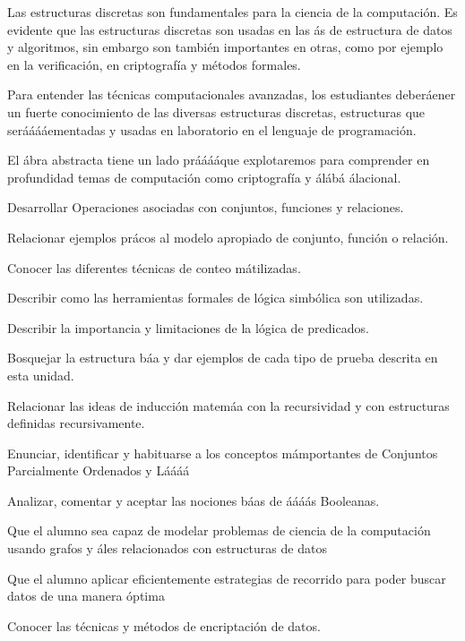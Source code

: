 \begin{syllabus}


\begin{justification}
Las estructuras discretas son fundamentales para la ciencia de la computación. Es evidente que las estructuras discretas son usadas en las ás de estructura de datos y algoritmos, sin embargo son también importantes en otras, como por ejemplo en la verificación, en criptografía y métodos formales.

Para entender las técnicas computacionales avanzadas, los estudiantes deberáener un fuerte conocimiento de las diversas estructuras discretas, estructuras que serááááementadas y usadas en laboratorio en el lenguaje de programación.

El ábra abstracta tiene un lado prááááque explotaremos para comprender en profundidad temas de computación como criptografía y álábá álacional.
\end{justification}

\begin{goals}
\item Desarrollar Operaciones asociadas con conjuntos, funciones y relaciones.
\item Relacionar ejemplos prácos al modelo apropiado de conjunto, función o relación.
\item Conocer las diferentes técnicas de conteo mátilizadas.
\item Describir como las herramientas formales de lógica simbólica son utilizadas.
\item Describir la importancia y limitaciones de la lógica de predicados.
\item Bosquejar la estructura báa y dar ejemplos de cada tipo de prueba descrita en esta unidad.
\item Relacionar las ideas de inducción matemáa con la recursividad y con estructuras definidas recursivamente.
\item Enunciar, identificar y habituarse a los conceptos mámportantes de Conjuntos Parcialmente Ordenados y Láááá
\item Analizar, comentar y aceptar las nociones báas de áááás Booleanas.
\item Que el alumno sea capaz de modelar problemas de ciencia de la computación usando grafos y áles relacionados con estructuras de datos
\item Que el alumno aplicar eficientemente estrategias de recorrido para poder buscar datos de una manera óptima
\item Conocer las técnicas y métodos de encriptación de datos.
\end{goals}


\end{syllabus}
